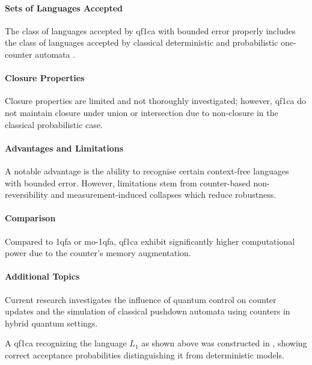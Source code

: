 \paragraph{Sets of Languages Accepted}
The class of languages accepted by \gls{qf1ca} with bounded error properly includes the class of languages accepted by classical deterministic and probabilistic one-counter automata \cite{bonner2001quantum}.

\paragraph{Closure Properties} 
Closure properties are limited and not thoroughly investigated; however, \gls{qf1ca} do not maintain closure under union or intersection due to non-closure in the classical probabilistic case.

\paragraph{Advantages and Limitations} 
A notable advantage is the ability to recognise certain context-free languages with bounded error. However, limitations stem from counter-based non-reversibility and measurement-induced collapses which reduce robustness.

\paragraph{Comparison} 
Compared to \gls{1qfa} or \gls{mo-1qfa}, \gls{qf1ca} exhibit significantly higher computational power due to the counter's memory augmentation.

\paragraph{Additional Topics} 
Current research investigates the influence of quantum control on counter updates and the simulation of classical pushdown automata using counters in hybrid quantum settings.

\begin{example}
A \gls{qf1ca} recognizing the language $L_1$ as shown above was constructed in \cite{bonner2001quantum}, showing correct acceptance probabilities distinguishing it from deterministic models.
\end{example}

\subsubsection{}

